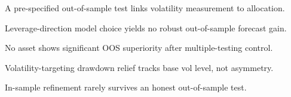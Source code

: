 %
%

\begin{highlights}
\item A pre-specified out-of-sample test links volatility measurement to allocation.
\item Leverage-direction model choice yields no robust out-of-sample forecast gain.
\item No asset shows significant OOS superiority after multiple-testing control.
\item Volatility-targeting drawdown relief tracks base vol level, not asymmetry.
\item In-sample refinement rarely survives an honest out-of-sample test.
\end{highlights}
